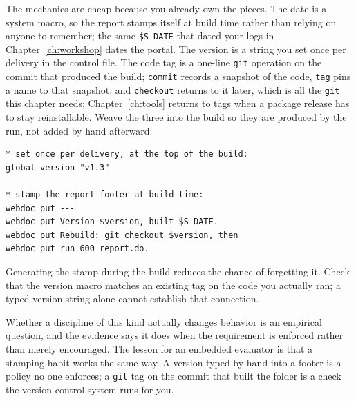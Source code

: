 \documentclass[
    a4paper,
    fontsize=10pt,
    twoside=true,
    numbers=noenddot,
]{kaobook}
\begin{document}
The mechanics are cheap because you already own the pieces. The date is a system macro, so the report stamps itself at build time rather than relying on anyone to remember; the same \texttt{\$S\_DATE} that dated your logs in Chapter~\ref{ch:workshop} dates the portal. The version is a string you set once per delivery in the control file. The code tag is a one-line \texttt{git} operation on the commit that produced the build; \texttt{commit} records a snapshot of the code, \texttt{tag} pins a name to that snapshot, and \texttt{checkout} returns to it later, which is all the \texttt{git} this chapter needs; Chapter~\ref{ch:tools} returns to tags when a package release has to stay reinstallable. Weave the three into the build so they are produced by the run, not added by hand afterward:
\par
{\footnotesize
\begin{verbatim}
* set once per delivery, at the top of the build:
global version "v1.3"

* stamp the report footer at build time:
webdoc put ---
webdoc put Version $version, built $S_DATE.
webdoc put Rebuild: git checkout $version, then
webdoc put run 600_report.do.
\end{verbatim}
}
Generating the stamp during the build reduces the chance of forgetting it. Check that the version macro matches an existing tag on the code you actually ran; a typed version string alone cannot establish that connection.

Whether a discipline of this kind actually changes behavior is an empirical question, and the evidence says it does when the requirement is enforced rather than merely encouraged. The lesson for an embedded evaluator is that a stamping habit works the same way. A version typed by hand into a footer is a policy no one enforces; a \texttt{git} tag on the commit that built the folder is a check the version-control system runs for you.
\end{document}
